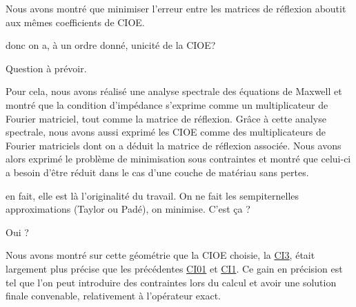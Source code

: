 Nous avons montré que minimiser l'erreur entre les matrices de réflexion aboutit aux mêmes coefficients de CIOE.
\begin{REM}
	donc on a, à un ordre donné, unicité de la CIOE?
\end{REM}
\begin{REP}
  Question à prévoir.
\end{REP}
Pour cela, nous avons réalisé une analyse spectrale des équations de Maxwell et montré que la condition d'impédance s'exprime comme un multiplicateur de Fourier matriciel, tout comme la matrice de réflexion.
Grâce à cette analyse spectrale, nous avons aussi exprimé les CIOE comme des multiplicateurs de Fourier matriciels dont on a déduit la matrice de réflexion associée.
Nous avons alors exprimé le problème de minimisation sous contraintes et montré que celui-ci a besoin d'être réduit dans le cas d'une couche de matériau sans pertes.
\begin{REM}
  en fait, elle est là l’originalité du travail.
  On ne fait les sempiternelles approximations (Taylor ou Padé), on minimise. C'est ça ?
\end{REM}
\begin{REP}
  Oui ?
\end{REP}
Nous avons montré sur cette géométrie que la CIOE choisie, la \hyperlink{ci3}{CI3}, était largement plus précise que les précédentes \hyperlink{ci01}{CI01} et \hyperlink{ci1}{CI1}.
Ce gain en précision est tel que l'on peut introduire des contraintes lors du calcul et avoir une solution finale convenable, relativement à l'opérateur exact.
